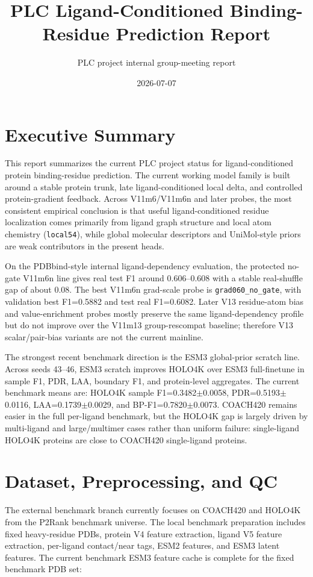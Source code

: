 \documentclass[11pt]{article}
\title{PLC Ligand-Conditioned Binding-Residue Prediction Report}
\author{PLC project internal group-meeting report}
\date{2026-07-07}
\begin{document}
\maketitle

\section*{Executive Summary}
This report summarizes the current PLC project status for ligand-conditioned protein binding-residue prediction.
The current working model family is built around a stable protein trunk, late ligand-conditioned local delta, and controlled protein-gradient feedback.
Across V11m6/V11m6n and later probes, the most consistent empirical conclusion is that useful ligand-conditioned residue localization comes primarily from ligand graph structure and local atom chemistry (\texttt{local54}), while global molecular descriptors and UniMol-style priors are weak contributors in the present heads.

On the PDBbind-style internal ligand-dependency evaluation, the protected no-gate V11m6n line gives real test F1 around 0.606--0.608 with a stable real-shuffle gap of about 0.08.
The best V11m6n grad-scale probe is \texttt{grad060\_no\_gate}, with validation best F1=0.5882 and test real F1=0.6082.
Later V13 residue-atom bias and value-enrichment probes mostly preserve the same ligand-dependency profile but do not improve over the V11m13 group-rescompat baseline; therefore V13 scalar/pair-bias variants are not the current mainline.

The strongest recent benchmark direction is the ESM3 global-prior scratch line.
Across seeds 43--46, ESM3 scratch improves HOLO4K over ESM3 full-finetune in sample F1, PDR, LAA, boundary F1, and protein-level aggregates.
The current benchmark means are: HOLO4K sample F1=0.3482$\pm$0.0058, PDR=0.5193$\pm$0.0116, LAA=0.1739$\pm$0.0029, and BP-F1=0.7820$\pm$0.0073.
COACH420 remains easier in the full per-ligand benchmark, but the HOLO4K gap is largely driven by multi-ligand and large/multimer cases rather than uniform failure: single-ligand HOLO4K proteins are close to COACH420 single-ligand proteins.

\section*{Dataset, Preprocessing, and QC}
The external benchmark branch currently focuses on COACH420 and HOLO4K from the P2Rank benchmark universe.
The local benchmark preparation includes fixed heavy-residue PDBs, protein V4 feature extraction, ligand V5 feature extraction, per-ligand contact/near tags, ESM2 features, and ESM3 latent features.
The current benchmark ESM3 feature cache is complete for the fixed benchmark PDB set:
\end{document}

